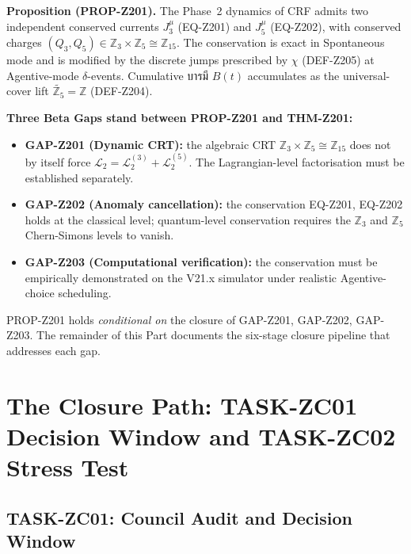 \documentclass[12pt, a4paper]{article}
\begin{document}
\begin{formalbox}[title={The Master Proposition: PROP-Z201}]
\textbf{Proposition (PROP-Z201).} The Phase~2 dynamics of CRF
admits two independent conserved currents $J^\mu_3$ (EQ-Z201) and
$J^\mu_5$ (EQ-Z202), with conserved charges
$(Q_3, Q_5) \in \mathbb{Z}_3 \times \mathbb{Z}_5 \cong \mathbb{Z}_{15}$.
The conservation is exact in Spontaneous mode and is modified by
the discrete jumps prescribed by $\chi$ (DEF-Z205) at Agentive-mode
$\delta$-events. Cumulative \textthai{บารมี} $B(t)$ accumulates as
the universal-cover lift $\widetilde{\mathbb{Z}_5} = \mathbb{Z}$
(DEF-Z204).

\textbf{Three Beta Gaps stand between PROP-Z201 and THM-Z201:}
\begin{itemize}[leftmargin=*]
\item \textbf{GAP-Z201 (Dynamic CRT):} the algebraic CRT
  $\mathbb{Z}_3 \times \mathbb{Z}_5 \cong \mathbb{Z}_{15}$ does not
  by itself force $\mathcal{L}_2 = \mathcal{L}_2^{(3)} + \mathcal{L}_2^{(5)}$.
  The Lagrangian-level factorisation must be established
  separately.
\item \textbf{GAP-Z202 (Anomaly cancellation):} the conservation
  EQ-Z201, EQ-Z202 holds at the classical level; quantum-level
  conservation requires the $\mathbb{Z}_3$ and $\mathbb{Z}_5$
  Chern-Simons levels to vanish.
\item \textbf{GAP-Z203 (Computational verification):} the
  conservation must be empirically demonstrated on the V21.x
  simulator under realistic Agentive-choice scheduling.
\end{itemize}
\end{formalbox}

\begin{keybox}[title={The Z2 Closure Question}]
PROP-Z201 holds \emph{conditional on} the closure of GAP-Z201,
GAP-Z202, GAP-Z203. The remainder of this Part documents the
six-stage closure pipeline that addresses each gap.
\end{keybox}



\section{The Closure Path: TASK-ZC01 Decision Window and TASK-ZC02 Stress Test}
\label{sec:Z2-zc01-zc02}

\subsection{TASK-ZC01: Council Audit and Decision Window}
\end{document}

